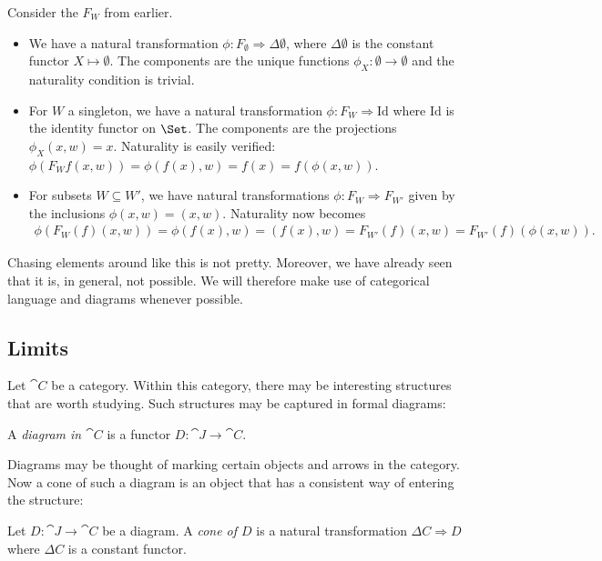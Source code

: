 \documentclass{article}
\begin{document}
\begin{example}
  Consider the $F_W$ from earlier.
  \begin{itemize}
    \item We have a natural transformation $\phi:F_\emptyset \Rightarrow
      \Delta\emptyset$, where $\Delta\emptyset$ is the constant functor
      $X\mapsto\emptyset$. The components are the unique functions
      $\phi_X:\emptyset\to\emptyset$ and the naturality condition is trivial.
    \item For $W$ a singleton, we have a natural transformation $\phi:F_W\Rightarrow
      \text{Id}$ where $\text{Id}$ is the identity functor on $\Set$. The
      components are the projections $\phi_X(x,w)=x$. Naturality is easily
      verified: $\phi(F_W f(x,w))=\phi(f(x),w) = f(x) = f(\phi(x,w))$.
    \item For subsets $W\subseteq W'$, we have natural transformations
      $\phi:F_W\Rightarrow F_{W'}$ given by the inclusions $\phi(x,w) = (x,w)$.
      Naturality now becomes
      \begin{align*}
        \phi(F_W(f)(x,w)) = \phi(f(x),w) = (f(x),w) = F_{W'}(f)(x,w) =
        F_{W'}(f)(\phi(x,w)).
      \end{align*}
  \end{itemize}
\end{example}

Chasing elements around like this is not pretty. Moreover, we have already
seen that it is, in general, not possible. We will therefore make use of
categorical language and diagrams whenever possible.

\subsection{Limits}

Let $\cat{C}$ be a category. Within this category, there may be interesting
structures that are worth studying. Such structures may be captured in
formal diagrams:

\begin{definition}
  A \emph{diagram in $\cat{C}$} is a functor $D:\cat{J}\to\cat{C}$.
\end{definition}

Diagrams may be thought of marking certain objects and arrows in the category.
Now a cone of such a diagram is an object that has a consistent way of entering
the structure:

\begin{definition}
  Let $D:\cat{J}\to\cat{C}$ be a diagram. A \emph{cone of $D$} is a
  natural transformation $\Delta C\Rightarrow D$ where $\Delta C$ is a
  constant functor.
\end{definition}
\end{document}
